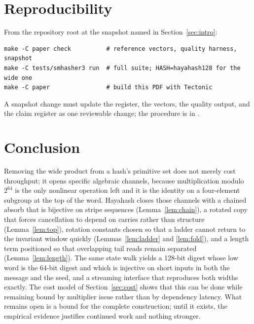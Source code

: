 \documentclass[10pt,a4paper]{article}
\theoremstyle{remark}
\begin{document}
\section{Reproducibility}
\label{sec:repro}

From the repository root at the snapshot named in Section~\ref{sec:intro}:

\begin{lstlisting}
make -C paper check          # reference vectors, quality harness, snapshot
make -C tests/smhasher3 run  # full suite; HASH=hayahash128 for the wide one
make -C paper                # build this PDF with Tectonic
\end{lstlisting}

A snapshot change must update the register, the vectors, the quality output,
and the claim register as one reviewable change; the procedure is in
.

\section{Conclusion}

Removing the wide product from a hash's primitive set does not merely cost
throughput; it opens specific algebraic channels, because multiplication
modulo \(2^{64}\) is the only nonlinear operation left and it is the identity
on a four-element subgroup at the top of the word.  Hayahash closes those
channels with a chained absorb that is bijective on stripe sequences
(Lemma~\ref{lem:chain}), a rotated copy that forces cancellation to depend on
carries rather than structure (Lemma~\ref{lem:top}), rotation constants
chosen so that a ladder cannot return to the invariant window quickly
(Lemmas~\ref{lem:ladder} and \ref{lem:fold}), and a length term positioned so
that overlapping tail reads remain separated (Lemma~\ref{lem:length}).  The
same state walk yields a 128-bit digest whose low word is the 64-bit digest
and which is injective on short inputs in both the message and the seed, and
a streaming interface that reproduces both widths exactly.  The cost model of
Section~\ref{sec:cost} shows that this can be done while remaining bound by
multiplier issue rather than by dependency latency.  What remains open is a
bound for the complete construction; until it exists, the empirical evidence
justifies continued work and nothing stronger.



\end{document}
